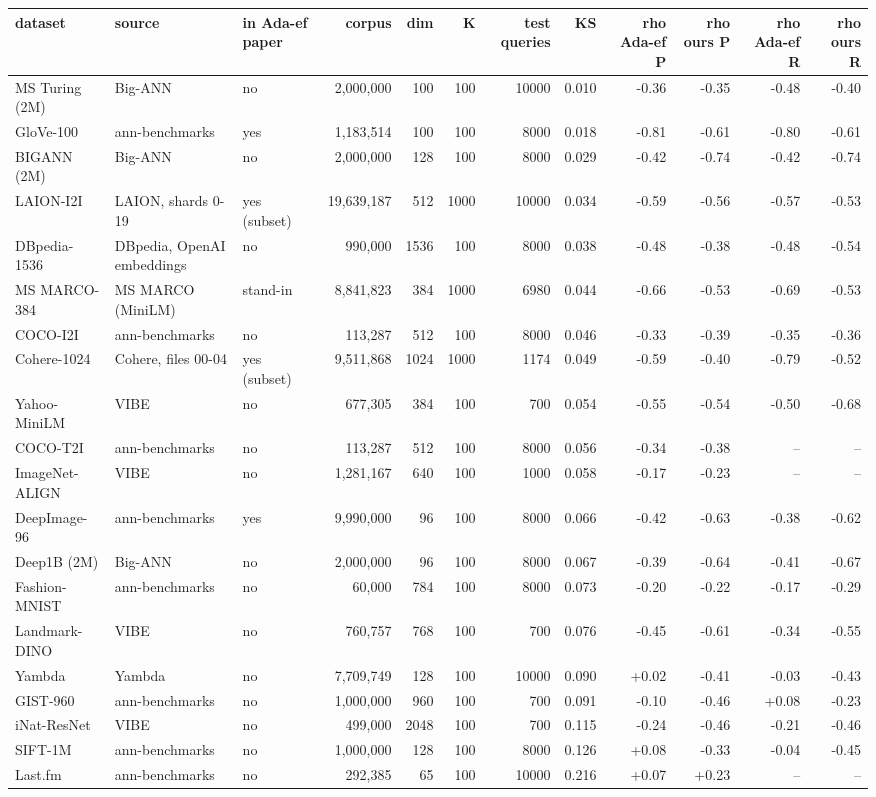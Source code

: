 \begin{tabular}{lllrrrrrrrrr}
\toprule
dataset & source & in Ada-ef paper & corpus & dim & K & test queries & KS & rho Ada-ef P & rho ours P & rho Ada-ef R & rho ours R \\
\midrule
MS Turing (2M) & Big-ANN & no & 2,000,000 & 100 & 100 & 10000 & 0.010 & -0.36 & -0.35 & -0.48 & -0.40 \\
GloVe-100 & ann-benchmarks & yes & 1,183,514 & 100 & 100 & 8000 & 0.018 & -0.81 & -0.61 & -0.80 & -0.61 \\
BIGANN (2M) & Big-ANN & no & 2,000,000 & 128 & 100 & 8000 & 0.029 & -0.42 & -0.74 & -0.42 & -0.74 \\
LAION-I2I & LAION, shards 0-19 & yes (subset) & 19,639,187 & 512 & 1000 & 10000 & 0.034 & -0.59 & -0.56 & -0.57 & -0.53 \\
DBpedia-1536 & DBpedia, OpenAI embeddings & no & 990,000 & 1536 & 100 & 8000 & 0.038 & -0.48 & -0.38 & -0.48 & -0.54 \\
MS MARCO-384 & MS MARCO (MiniLM) & stand-in & 8,841,823 & 384 & 1000 & 6980 & 0.044 & -0.66 & -0.53 & -0.69 & -0.53 \\
COCO-I2I & ann-benchmarks & no & 113,287 & 512 & 100 & 8000 & 0.046 & -0.33 & -0.39 & -0.35 & -0.36 \\
Cohere-1024 & Cohere, files 00-04 & yes (subset) & 9,511,868 & 1024 & 1000 & 1174 & 0.049 & -0.59 & -0.40 & -0.79 & -0.52 \\
Yahoo-MiniLM & VIBE & no & 677,305 & 384 & 100 & 700 & 0.054 & -0.55 & -0.54 & -0.50 & -0.68 \\
COCO-T2I & ann-benchmarks & no & 113,287 & 512 & 100 & 8000 & 0.056 & -0.34 & -0.38 & -- & -- \\
ImageNet-ALIGN & VIBE & no & 1,281,167 & 640 & 100 & 1000 & 0.058 & -0.17 & -0.23 & -- & -- \\
DeepImage-96 & ann-benchmarks & yes & 9,990,000 & 96 & 100 & 8000 & 0.066 & -0.42 & -0.63 & -0.38 & -0.62 \\
Deep1B (2M) & Big-ANN & no & 2,000,000 & 96 & 100 & 8000 & 0.067 & -0.39 & -0.64 & -0.41 & -0.67 \\
Fashion-MNIST & ann-benchmarks & no & 60,000 & 784 & 100 & 8000 & 0.073 & -0.20 & -0.22 & -0.17 & -0.29 \\
Landmark-DINO & VIBE & no & 760,757 & 768 & 100 & 700 & 0.076 & -0.45 & -0.61 & -0.34 & -0.55 \\
Yambda & Yambda & no & 7,709,749 & 128 & 100 & 10000 & 0.090 & +0.02 & -0.41 & -0.03 & -0.43 \\
GIST-960 & ann-benchmarks & no & 1,000,000 & 960 & 100 & 700 & 0.091 & -0.10 & -0.46 & +0.08 & -0.23 \\
iNat-ResNet & VIBE & no & 499,000 & 2048 & 100 & 700 & 0.115 & -0.24 & -0.46 & -0.21 & -0.46 \\
SIFT-1M & ann-benchmarks & no & 1,000,000 & 128 & 100 & 8000 & 0.126 & +0.08 & -0.33 & -0.04 & -0.45 \\
Last.fm & ann-benchmarks & no & 292,385 & 65 & 100 & 10000 & 0.216 & +0.07 & +0.23 & -- & -- \\
\bottomrule
\end{tabular}

